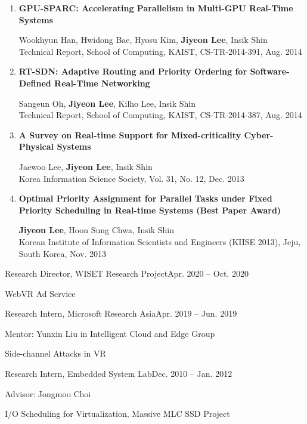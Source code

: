 \documentclass[11pt,letterpaper]{article}
\begin{document}
\begin{enumerate}
	\item \textbf{GPU-SPARC: Accelerating Parallelism in Multi-GPU Real-Time Systems} \\
	\begin{small}
		Wookhyun Han, Hwidong Bae, Hyosu Kim, \textbf{Jiyeon Lee}, Insik Shin\\ 
		Technical Report, School of Computing, KAIST, CS-TR-2014-391, Aug. 2014
	\end{small}

	\item \textbf{RT-SDN: Adaptive Routing and Priority Ordering for Software-Defined Real-Time Networking} \\
	\begin{small}
		Sangeun Oh, \textbf{Jiyeon Lee}, Kilho Lee, Insik Shin\\ 
		Technical Report, School of Computing, KAIST, CS-TR-2014-387, Aug. 2014
	\end{small}

	\item \textbf{A Survey on Real-time Support for Mixed-criticality Cyber-Physical Systems} \\
	\begin{small}
		Jaewoo Lee, \textbf{Jiyeon Lee}, Insik Shin\\ 
		Korea Information Science Society, Vol. 31, No. 12, Dec. 2013
	\end{small}

	\item \textbf{Optimal Priority Assignment for Parallel Tasks under Fixed Priority Scheduling in Real-time Systems (Best Paper Award)} \\
	\begin{small}
		\textbf{Jiyeon Lee}, Hoon Sung Chwa, Insik Shin\\ 
		Korean Institute of Information Scientists and Engineers (KIISE 2013), Jeju, South Korea, Nov. 2013
	\end{small}
\end{enumerate}

%
%

\begin{envtime}{Research Director, WISET Research Project}{Apr. 2020 -- Oct. 2020}
	\item WebVR Ad Service
\end{envtime}
\begin{envtime}{Research Intern, Microsoft Research Asia}{Apr. 2019 -- Jun. 2019}
	\item Mentor:  Yunxin Liu in Intelligent Cloud and Edge Group
	\item Side-channel Attacks in VR
\end{envtime}
\begin{envtime}{Research Intern, Embedded System Lab}{Dec. 2010 -- Jan. 2012}
	\item Advisor: Jongmoo Choi
	\item I/O Scheduling for Virtualization, Massive MLC SSD Project
\end{envtime}
\end{document}

